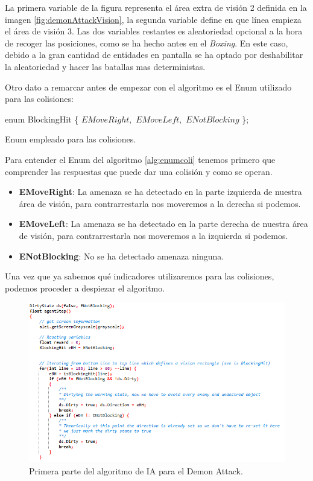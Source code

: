 La primera variable de la figura representa el área extra de visión 2 definida en la imagen \ref{fig:demonAttackVision}, la segunda variable define en que línea empieza el área de visión 3. Las dos variables restantes es aleatoriedad opcional a la hora de recoger las posiciones, como se ha hecho antes en el \textit{Boxing}. En este caso, debido a la gran cantidad de entidades en pantalla se ha optado por deshabilitar la aleatoriedad y hacer las batallas mas deterministas.

Otro dato a remarcar antes de empezar con el algoritmo es el Enum utilizado para las colisiones:

\vspace{4mm}
\begin{algorithm}[H]
	enum BlockingHit \{
		$EMoveRight,$
		$EMoveLeft,$
		$ENotBlocking$
	\};
	\caption{Enum empleado para las colisiones.}
	\label{alg:enumcoli}
\end{algorithm}

\vspace{4mm}
Para entender el Enum del algoritmo \ref{alg:enumcoli} tenemos primero que comprender las respuestas que puede dar una colisión y como se operan. 

\begin{itemize}
	\item \textbf{EMoveRight}: La amenaza se ha detectado en la parte izquierda de nuestra área de visión, para contrarrestarla nos moveremos a la derecha si podemos.
	\item \textbf{EMoveLeft}: La amenaza se ha detectado en la parte derecha de nuestra área de visión, para contrarrestarla nos moveremos a la izquierda si podemos.
	\item \textbf{ENotBlocking}: No se ha detectado amenaza ninguna.
\end{itemize}

\newpage
Una vez que ya sabemos qué indicadores utilizaremos para las colisiones, podemos proceder a despiezar el algoritmo.

\begin{figure}[h]
	\centering
	\includegraphics[width=1\textwidth]{Figures/demonattackp1algo}
	\caption{Primera parte del algoritmo de IA para el Demon Attack.}
	\label{fig:demonattackp1algo}
\end{figure}

